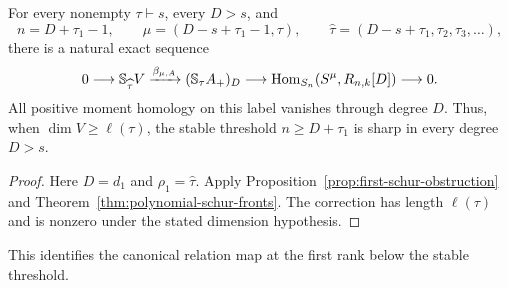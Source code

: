 \begin{theorem}
\label{thm:first-unstable-specht-wall}
For every nonempty $\tau\vdash s$, every $D>s$, and
\[
 n=D+\tau_1-1,\qquad
 \mu=(D-s+\tau_1-1,\tau),\qquad
 \widehat\tau=(D-s+\tau_1,\tau_2,\tau_3,\ldots),
\]
there is a natural exact sequence
\begin{equation}\label{eq:first-unstable-specht-wall}
 0\longrightarrow\mathbb S_{\widehat\tau}V
 \xrightarrow{\beta_{\mu,A}}(\mathbb S_\tau A_+)_D
 \longrightarrow\operatorname{Hom}_{S_n}(S^\mu,R_{n,k}[D])\longrightarrow0.
\end{equation}
All positive moment homology on this label vanishes through degree $D$.
Thus, when $\dim V\ge\ell(\tau)$, the stable threshold
$n\ge D+\tau_1$ is sharp in every degree $D>s$.
\end{theorem}
\begin{proof}
Here $D=d_1$ and $\rho_1=\widehat\tau$. Apply
Proposition~\ref{prop:first-schur-obstruction} and
Theorem~\ref{thm:polynomial-schur-fronts}. The correction has length
$\ell(\tau)$ and is nonzero under the stated dimension hypothesis.
\end{proof}

This identifies the canonical relation map at the first rank below
the stable threshold.

